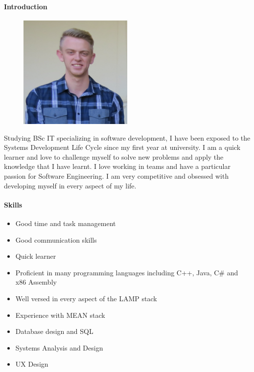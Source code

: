 \documentclass{article}
\begin{document}
        \paragraph{Introduction}
        \begin{figure}
              \begin{center}
                \vspace{-0.75cm}
                \includegraphics[width=0.5\textwidth]{img/nicolai.jpg}
              \end{center}
            \end{figure}
            Studying BSc IT specializing in software development, I have been exposed to the Systems Development Life Cycle since my first year at university. I am a quick learner and love to challenge myself to solve new problems and apply the knowledge that I have learnt. I love working in teams and have a particular passion for Software Engineering. I am very competitive and obsessed with developing myself in every aspect of my life.
            
        \paragraph{Skills}
            \begin{itemize}
                \item Good time and task management
                \item Good communication skills
                \item Quick learner
                \item Proficient in many programming languages including C++, Java, C\# and x86 Assembly
                \item Well versed in every aspect of the LAMP stack
                \item Experience with MEAN stack
                \item Database design and SQL
                \item Systems Analysis and Design
                \item UX Design
            \end{itemize}
            
\end{document}
